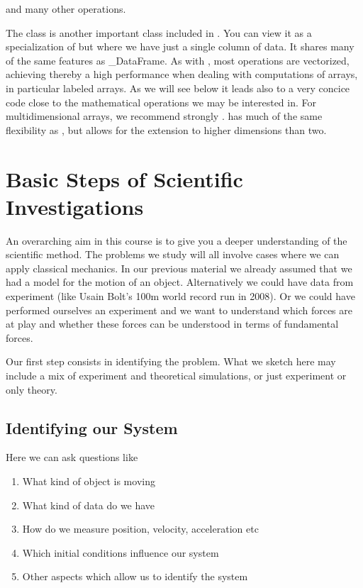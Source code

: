 \documentclass[letterpaper,10pt,english]{sphinxmanual}
\begin{document}
and many other operations.

The  class is another important class included in
. You can view it as a specialization of  but where
we have just a single column of data. It shares many of the same features as \_DataFrame. As with ,
most operations are vectorized, achieving thereby a high performance when dealing with computations of arrays, in particular labeled arrays.
As we will see below it leads also to a very concice code close to the mathematical operations we may be interested in.
For multidimensional arrays, we recommend strongly .  has much of the same flexibility as , but allows for the extension to higher dimensions than two.


\section{Basic Steps of Scientific Investigations}
\label{\detokenize{chapter3:basic-steps-of-scientific-investigations}}\label{\detokenize{chapter3::doc}}
An overarching aim in this course is to give you a deeper
understanding of the scientific method. The problems we study will all
involve cases where we can apply classical mechanics. In our previous
material we already assumed that we had a model for the motion of an
object.  Alternatively we could have data from experiment (like Usain
Bolt’s 100m world record run in 2008).  Or we could have performed
ourselves an experiment and we want to understand which forces are at
play and whether these forces can be understood in terms of
fundamental forces.

Our first step consists in identifying the problem. What we sketch
here may include a mix of experiment and theoretical simulations, or
just experiment or only theory.


\subsection{Identifying our System}
\label{\detokenize{chapter3:identifying-our-system}}
Here we can ask questions like
\begin{enumerate}
%
\item {} 
What kind of object is moving

\item {} 
What kind of data do we have

\item {} 
How do we measure position, velocity, acceleration etc

\item {} 
Which initial conditions influence our system

\item {} 
Other aspects which allow us to identify the system

\end{enumerate}
\end{document}
